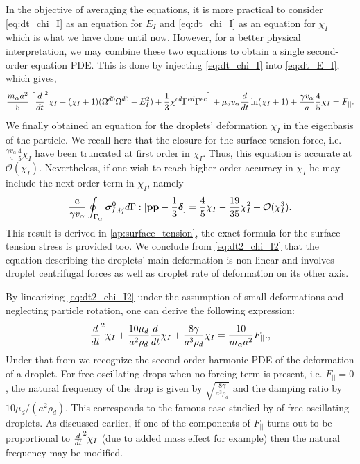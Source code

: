 In the objective of averaging the equations, it is more practical to consider \ref{eq:dt_chi_I} as an equation for $E_I$ and \ref{eq:dt_chi_I} as an equation for $\chi_I$ which is what we have done until now. 
However, for a better physical interpretation, we may combine these two equations to obtain a single second-order equation PDE. 
This is done by injecting \ref{eq:dt_chi_I} into \ref{eq:dt_E_I}, which gives, 
\begin{equation}
    \frac{m_\alpha a^2}{5} \left[
        \ddt^2 \chi_I
        - (\chi_I+1)( \Omega^{d0} \Omega^{d0}  - E_I^2) 
        + \frac{1}{3} \chi^{cd}
        \Gamma^{ed}\Gamma^{ec}
    \right]
    +  \mu_d v_\alpha \ddt \ln(\chi_I+1)
    + \frac{\gamma v_\alpha }{a} 
    \frac{4  }{5} \chi_I
    = F_{||}. 
    \label{eq:dt2_chi_I2}
\end{equation} 
We finally obtained an equation for the droplets' deformation $\chi_I$ in the eigenbasis of the particle.
We recall here that the closure for the surface tension force, i.e. $\frac{\gamma v_\alpha }{a} \frac{4  }{5} \chi_I$ have been truncated at first order in $\chi_I$.
Thus, this equation is accurate at $\mathcal{O}(\chi_I)$.
Nevertheless, if one wish to reach higher order accuracy in $\chi_I$ he may include the next order term in $\chi_I$, namely 
\begin{equation*}
    \frac{a}{\gamma v_\alpha}\oint_{\Gamma_{\alpha}} \bm\sigma_{I,ij}^0 d\Gamma : [\textbf{pp} - \frac{1}{3} \bm\delta]
    = \frac{4}{5} \chi_I - \frac{19}{35}\chi_I^2 + \mathcal{O}(\chi_I^3). 
\end{equation*}
This result is derived in \ref{ap:surface_tension}, the exact formula for the surface tension stress is provided too.  
We conclude from \ref{eq:dt2_chi_I2} that the equation describing the droplets' main deformation is non-linear and involves droplet centrifugal forces as well as droplet rate of deformation on its other axis. 


By linearizing \ref{eq:dt2_chi_I2} under the assumption of small deformations and neglecting particle rotation, one can derive the following expression:
\begin{equation}
    \ddt^2 \chi_I
    +\frac{10 \mu_d}{a^2\rho_d}   \ddt \chi_I
    + \frac{8 \gamma }{a^3\rho_d} 
     \chi_I
    = \frac{10}{m_\alpha a^2}F_{||}. ,
    \label{eq:lamb_like_model}
\end{equation} 
Under that from we recognize the second-order harmonic PDE of the deformation of a droplet.
For free oscillating drops when no forcing term is present, i.e. $F_{||} = 0$, the natural frequency of the drop is given by $\sqrt{\frac{8 \gamma }{a^3\rho_d}}$ and the damping ratio by $10 \mu_d  /(a^2\rho_d)$. 
This corresponds to the famous case studied by  \citet{lamb1924hydrodynamics} of free oscillating droplets. 
As discussed earlier, if one of the components of $F_{||}$ turns out to be proportional to $\frac{d}{dt}^2 \chi_I$ (due to added mass effect for example) then the natural frequency may be modified. 

